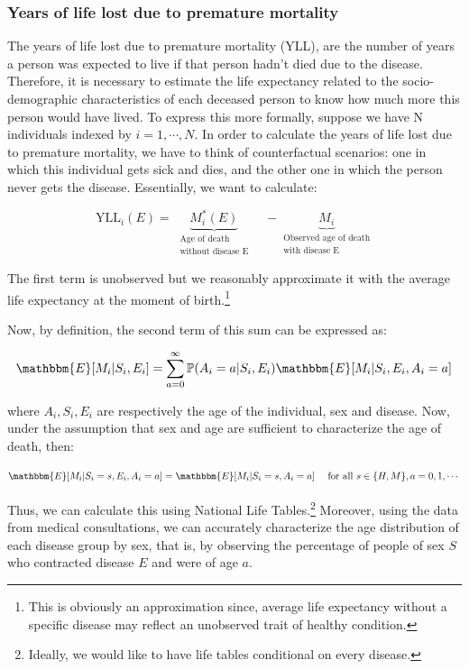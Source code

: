 \documentclass[11pt]{article}
\numberwithin{equation}{section}
\theoremstyle{remark}
\begin{document}
\subsubsection{Years of life lost due to premature mortality}

The years of life lost due to premature mortality (YLL), are the number of years a person was expected to live if that person hadn’t died due to the disease. Therefore, it is necessary to estimate the life expectancy related to the socio-demographic characteristics of each deceased person to know how much more this person would have lived. 
To express this more formally, suppose we have N individuals indexed by $i=1,\cdots, N$. In order to calculate the years of life lost due to premature mortality, we have to think of counterfactual scenarios: one in which this individual gets sick and dies, and the other one in which the person never gets the disease. Essentially, we want to calculate:

 $$\text{YLL}_i(E)= \;\underbrace{M_i^*(E)}_{\substack{\text{Age of death}\\\text{without disease E}}}\quad -\underbrace{M_i}_{\substack{\text{Observed age of death}\\ \text{with disease E}}} $$

The first term is unobserved but we reasonably approximate it with the average life expectancy at the moment of birth.\footnote{This is obviously an approximation since, average life expectancy without a specific disease may reflect an unobserved trait of healthy condition.}  


Now, by definition, the second term of this sum can be expressed as:


$$\mathbbm{E}[M_i|S_i,E_i]= \sum \limits_{a=0}^\infty \mathbb{P}(A_i=a|S_i,E_i) \mathbbm{E}[M_i|S_i,E_i,A_i=a]$$

where $A_i,S_i, E_i$ are respectively the age of the individual, sex and disease. Now, under the assumption that sex and age are sufficient to characterize the age of death, then:

$$\mathbbm{E}[M_i|S_i=s,E_i,A_i=a]=\mathbbm{E}[M_i|S_i=s,A_i=a] \quad \text{ for all } s \in \{H,M\}, a=0,1,\cdots$$

Thus, we can calculate this using National Life Tables.\footnote{
Ideally, we would like to have life tables conditional on every disease.} Moreover, using the data from medical consultations, we can accurately characterize the age distribution of each disease group by sex, that is, by observing the percentage of people of sex $S$ who contracted disease $E$ and were of age $a$.
\end{document}
